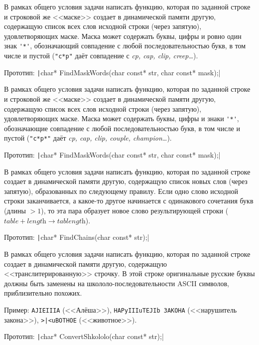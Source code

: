 \begin{zztask}
В рамках общего условия задачи написать функцию, которая по заданной строке
и строковой же <<маске>> создает в динамической памяти другую, содержащую список
всех слов исходной строки (через запятую), удовлетворяющих маске. Маска может
содержать буквы, цифры и ровно один знак \verb|'*'|, обозначающий совпадение с любой
последовательностью букв, в том числе и пустой (\verb|"c*p"| даёт совпадение с
\textit{cp, cap, clip, creep\dots}).

Прототип: \texttt|char* FindMaskWords(char const* str, char const* mask);|
\end{zztask}

\begin{zztask}
В рамках общего условия задачи написать функцию, которая по заданной строке
и строковой же <<маске>> создает в динамической памяти другую, содержащую список
всех слов исходной строки (через запятую), удовлетворяющих маске. Маска может
содержать буквы, цифры и знаки \verb|'*'|, обозначающие совпадение с любой
последовательностью букв, в том числе и пустой (\verb|"c*p*"| даёт
\textit{cp, cap, clip, couple, champion\dots}).

Прототип: \texttt|char* FindMaskWords(char const* str, char const* mask);|
\end{zztask}

\begin{zztask}
В рамках общего условия задачи написать функцию, которая по заданной строке
создает в динамической памяти другую, содержащую список новых слов (через
запятую), образованных по следующему правилу. Если одно слово исходной строки
заканчивается, а какое-то другое начинается с одинакового сочетания букв
(длины $> 1$), то эта пара образует новое слово результирующей строки
($\textit{table} + \textit{length} \rightarrow \textit{tablength}$).

Прототип: \texttt|char* FindChains(char const* str);|
\end{zztask}

\begin{zztask}
В рамках общего условия задачи написать функцию, которая по заданной строке
создает в динамической памяти другую, содержащую <<транслитерированную>>
строчку. В этой строке оригинальные русские буквы должны быть заменены на
школоло-последовательности ASCII символов, приблизительно похожих.

Пример:
\verb|AJIEIIIA| (<<Алёша>>), \verb|HAPyIIIuTEJIb 3AKOHA|
(<<нарушитель закона>>), \verb!>|<uBOTHOE! (<<животное>>).

Прототип: \texttt|char* ConvertShkololo(char const* str);|
\end{zztask}

